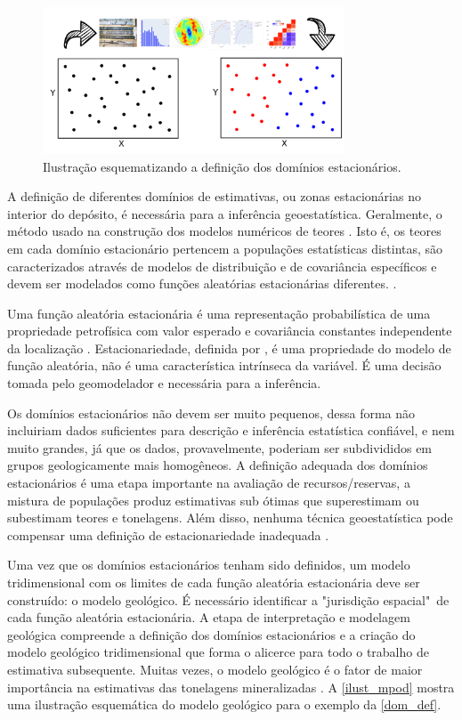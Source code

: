 \begin{figure}[H]
	\centering
	\caption{\label{dom_def}Ilustração esquematizando a definição dos domínios estacionários.}
	\includegraphics[width=0.8\textwidth]{capitulo_1/imagens/dom_def}
\end{figure}

A definição de diferentes domínios de estimativas, ou zonas estacionárias no interior do depósito, é necessária para a inferência geoestatística. Geralmente, o método usado na construção dos modelos numéricos de teores \cite{mclennanstationarity}. Isto é, os teores em cada domínio estacionário pertencem a populações estatísticas distintas, são caracterizados através de modelos de distribuição e de covariância específicos e devem ser modelados como funções aleatórias estacionárias diferentes. \cite{journel1978mining}. 

Uma função aleatória estacionária é uma representação probabilística de uma propriedade petrofísica com valor esperado e covariância constantes independente da localização \cite{mclennanstationarity}. Estacionariedade, definida por , é uma propriedade do modelo de função aleatória, não é uma característica intrínseca da variável. É uma decisão tomada pelo geomodelador e necessária para a inferência.

Os domínios estacionários não devem ser muito pequenos, dessa forma não incluiriam dados suficientes para descrição e inferência estatística confiável, e nem muito grandes, já que os dados, provavelmente, poderiam ser subdivididos em grupos geologicamente mais homogêneos. A definição adequada dos domínios estacionários é uma etapa importante na avaliação de recursos/reservas, a mistura de populações produz estimativas sub ótimas que superestimam ou subestimam teores e tonelagens. Além disso, nenhuma técnica geoestatística pode compensar uma definição de estacionariedade inadequada \cite{rossi2013mineral}.

Uma vez que os domínios estacionários tenham sido definidos, um modelo tridimensional com os limites de cada função aleatória estacionária deve ser construído: o modelo geológico. É necessário identificar a "jurisdição espacial"\ de cada função aleatória estacionária. A etapa de interpretação e modelagem geológica compreende a definição dos domínios estacionários e a criação do modelo geológico tridimensional que forma o alicerce para todo o trabalho de estimativa subsequente. Muitas vezes, o modelo geológico é o fator de maior importância na estimativas das tonelagens mineralizadas \cite{rossi2013mineral}. A \autoref{ilust_mpod} mostra uma ilustração esquemática do modelo geológico para o exemplo da \autoref{dom_def}.

